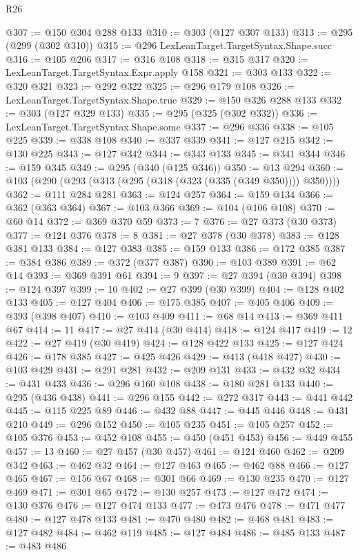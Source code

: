 \begin{lexlean}{R26}
\begin{coremodule}
@307 := @150 @304 @288 @133
@310 := @303 (@127 @307 @133)
@313 := @295 (@299 (@302 @310))
@315 := @296 LexLeanTarget.TargetSyntax.Shape.succ
@316 := @105 @206
@317 := @316 @108
@318 := @315 @317
@320 := LexLeanTarget.TargetSyntax.Expr.apply @158
@321 := @303 @133
@322 := @320 @321
@323 := @292 @322
@325 := @296 @179 @108
@326 := LexLeanTarget.TargetSyntax.Shape.true
@329 := @150 @326 @288 @133
@332 := @303 (@127 @329 @133)
@335 := @295 (@325 (@302 @332))
@336 := LexLeanTarget.TargetSyntax.Shape.some
@337 := @296 @336
@338 := @105 @225
@339 := @338 @108
@340 := @337 @339
@341 := @127 @215
@342 := @130 @225
@343 := @127 @342
@344 := @343 @133
@345 := @341 @344
@346 := @159 @345
@349 := @295 (@340 (@125 @346))
@350 := @13 @294
@360 := @103 (@290 (@293 (@313 (@295 (@318 (@323 (@335 (@349 @350)))) @350))))
@362 := @111 @284 @281
@363 := @124 @257
@364 := @159 @134
@366 := @362 (@363 @364)
@367 := @103 @366
@369 := @104 (@106 @108)
@370 := @60 @14
@372 := @369 @370 @59
@373 := 7
@376 := @27 @373 (@30 @373)
@377 := @124 @376
@378 := 8
@381 := @27 @378 (@30 @378)
@383 := @128 @381 @133
@384 := @127 @383
@385 := @159 @133
@386 := @172 @385
@387 := @384 @386
@389 := @372 (@377 @387)
@390 := @103 @389
@391 := @62 @14
@393 := @369 @391 @61
@394 := 9
@397 := @27 @394 (@30 @394)
@398 := @124 @397
@399 := 10
@402 := @27 @399 (@30 @399)
@404 := @128 @402 @133
@405 := @127 @404
@406 := @175 @385
@407 := @405 @406
@409 := @393 (@398 @407)
@410 := @103 @409
@411 := @68 @14
@413 := @369 @411 @67
@414 := 11
@417 := @27 @414 (@30 @414)
@418 := @124 @417
@419 := 12
@422 := @27 @419 (@30 @419)
@424 := @128 @422 @133
@425 := @127 @424
@426 := @178 @385
@427 := @425 @426
@429 := @413 (@418 @427)
@430 := @103 @429
@431 := @291 @281
@432 := @209 @131
@433 := @432 @32
@434 := @431 @433
@436 := @296 @160 @108
@438 := @180 @281 @133
@440 := @295 (@436 @438)
@441 := @296 @155
@442 := @272 @317
@443 := @441 @442
@445 := @115 @225 @89
@446 := @432 @88
@447 := @445 @446
@448 := @431 @210
@449 := @296 @152
@450 := @105 @235
@451 := @105 @257
@452 := @105 @376
@453 := @452 @108
@455 := @450 (@451 @453)
@456 := @449 @455
@457 := 13
@460 := @27 @457 (@30 @457)
@461 := @124 @460
@462 := @209 @342
@463 := @462 @32
@464 := @127 @463
@465 := @462 @88
@466 := @127 @465
@467 := @156 @67
@468 := @301 @66
@469 := @130 @235
@470 := @127 @469
@471 := @301 @65
@472 := @130 @257
@473 := @127 @472
@474 := @130 @376
@476 := @127 @474 @133
@477 := @473 @476
@478 := @471 @477
@480 := @127 @478 @133
@481 := @470 @480
@482 := @468 @481
@483 := @127 @482
@484 := @462 @119
@485 := @127 @484
@486 := @485 @133
@487 := @483 @486

\end{coremodule}
\end{lexlean}
